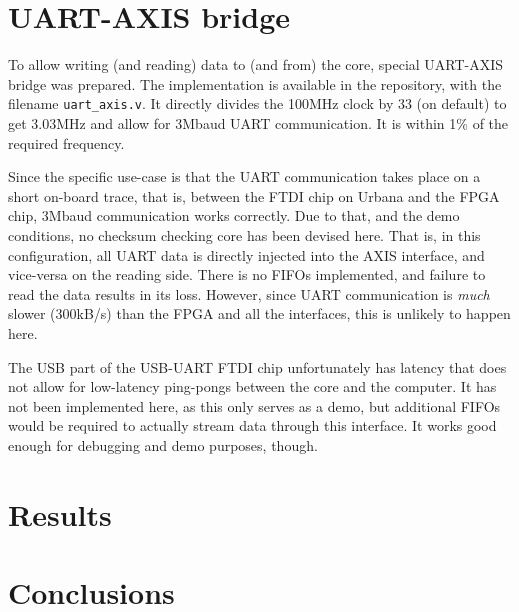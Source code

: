 \documentclass[a4paper,twocolumn]{article}
\begin{document}
\section{UART-AXIS bridge}

To allow writing (and reading) data to (and from) the core, special
UART-AXIS bridge was prepared. The implementation is available in the
repository, with the filename \texttt{uart\_axis.v}. It directly
divides the 100MHz clock by 33 (on default) to get 3.03MHz and
allow for 3Mbaud UART communication. It is within 1\% of the required
frequency.

Since the specific use-case is that the UART communication takes place
on a short on-board trace, that is, between the FTDI chip on Urbana
and the FPGA chip, 3Mbaud communication works correctly. Due to that,
and the demo conditions, no checksum checking core has been devised
here. That is, in this configuration, all UART data is directly
injected into the AXIS interface, and vice-versa on the reading side.
There is no FIFOs implemented, and failure to read the data results in
its loss. However, since UART communication is \emph{much} slower
(300kB/s) than the FPGA and all the interfaces, this is unlikely to
happen here.

The USB part of the USB-UART FTDI chip unfortunately has latency that
does not allow for low-latency ping-pongs between the core and the
computer. It has not been implemented here, as this only serves as a
demo, but additional FIFOs would be required to actually stream data
through this interface. It works good enough for debugging and demo
purposes, though.

\section{Results}



\section{Conclusions}
\end{document}
